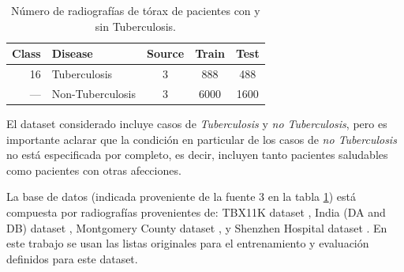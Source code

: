 \begin{table}[!ht]
    \centering
    \begin{tabular}{| r |l | c | c | c |}
     \hline
     Class & Disease & Source & Train & Test  \\
     \hline\hline
     16  & Tuberculosis        & 3 & 888   & 488  \\
     ---&  Non-Tuberculosis     & 3 & 6000  & 1600 \\
     \hline
    \end{tabular}
    \caption{ Número de radiografías de tórax de pacientes con y sin Tuberculosis.}
\label{table_dataset_tb}
\end{table}

El dataset considerado incluye casos de \textit{Tuberculosis} y \textit{no Tuberculosis}, pero es
importante aclarar que la condición en particular de los casos de \textit{no Tuberculosis} no está
especificada por completo, es decir, incluyen tanto pacientes saludables como pacientes con otras
afecciones.

La base de datos (indicada proveniente de la fuente 3 en la tabla \ref{table_dataset_tb}) está
compuesta por radiografías provenientes de: TBX11K dataset \cite{liu2020rethinking}, India (DA and DB)
dataset \cite{chauhan2014role}, Montgomery County dataset \cite{jaeger2014two}, y Shenzhen Hospital
dataset \cite{jaeger2014two}. En este trabajo se usan las listas originales para el entrenamiento y
evaluación definidos para este dataset.


